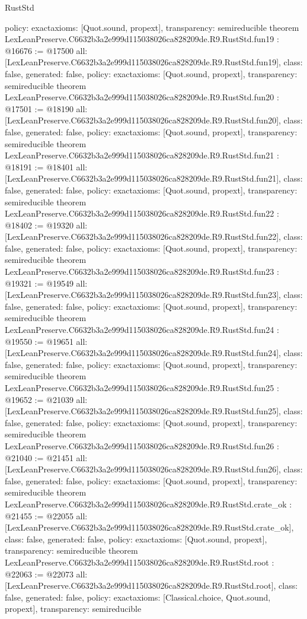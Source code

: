 \begin{lexlean}{RustStd}
\begin{coremodule}
{  policy: exact{axioms: [Quot.sound, propext]},
  transparency: semireducible
}
theorem LexLeanPreserve.C6632b3a2e999d115038026ca828209de.R9.RustStd.fun19 : @16676 := @17500 {
  all: [LexLeanPreserve.C6632b3a2e999d115038026ca828209de.R9.RustStd.fun19],
  class: false,
  generated: false,
  policy: exact{axioms: [Quot.sound, propext]},
  transparency: semireducible
}
theorem LexLeanPreserve.C6632b3a2e999d115038026ca828209de.R9.RustStd.fun20 : @17501 := @18190 {
  all: [LexLeanPreserve.C6632b3a2e999d115038026ca828209de.R9.RustStd.fun20],
  class: false,
  generated: false,
  policy: exact{axioms: [Quot.sound, propext]},
  transparency: semireducible
}
theorem LexLeanPreserve.C6632b3a2e999d115038026ca828209de.R9.RustStd.fun21 : @18191 := @18401 {
  all: [LexLeanPreserve.C6632b3a2e999d115038026ca828209de.R9.RustStd.fun21],
  class: false,
  generated: false,
  policy: exact{axioms: [Quot.sound, propext]},
  transparency: semireducible
}
theorem LexLeanPreserve.C6632b3a2e999d115038026ca828209de.R9.RustStd.fun22 : @18402 := @19320 {
  all: [LexLeanPreserve.C6632b3a2e999d115038026ca828209de.R9.RustStd.fun22],
  class: false,
  generated: false,
  policy: exact{axioms: [Quot.sound, propext]},
  transparency: semireducible
}
theorem LexLeanPreserve.C6632b3a2e999d115038026ca828209de.R9.RustStd.fun23 : @19321 := @19549 {
  all: [LexLeanPreserve.C6632b3a2e999d115038026ca828209de.R9.RustStd.fun23],
  class: false,
  generated: false,
  policy: exact{axioms: [Quot.sound, propext]},
  transparency: semireducible
}
theorem LexLeanPreserve.C6632b3a2e999d115038026ca828209de.R9.RustStd.fun24 : @19550 := @19651 {
  all: [LexLeanPreserve.C6632b3a2e999d115038026ca828209de.R9.RustStd.fun24],
  class: false,
  generated: false,
  policy: exact{axioms: [Quot.sound, propext]},
  transparency: semireducible
}
theorem LexLeanPreserve.C6632b3a2e999d115038026ca828209de.R9.RustStd.fun25 : @19652 := @21039 {
  all: [LexLeanPreserve.C6632b3a2e999d115038026ca828209de.R9.RustStd.fun25],
  class: false,
  generated: false,
  policy: exact{axioms: [Quot.sound, propext]},
  transparency: semireducible
}
theorem LexLeanPreserve.C6632b3a2e999d115038026ca828209de.R9.RustStd.fun26 : @21040 := @21451 {
  all: [LexLeanPreserve.C6632b3a2e999d115038026ca828209de.R9.RustStd.fun26],
  class: false,
  generated: false,
  policy: exact{axioms: [Quot.sound, propext]},
  transparency: semireducible
}
theorem LexLeanPreserve.C6632b3a2e999d115038026ca828209de.R9.RustStd.crate_ok : @21455 := @22055 {
  all: [LexLeanPreserve.C6632b3a2e999d115038026ca828209de.R9.RustStd.crate_ok],
  class: false,
  generated: false,
  policy: exact{axioms: [Quot.sound, propext]},
  transparency: semireducible
}
theorem LexLeanPreserve.C6632b3a2e999d115038026ca828209de.R9.RustStd.root : @22063 := @22073 {
  all: [LexLeanPreserve.C6632b3a2e999d115038026ca828209de.R9.RustStd.root],
  class: false,
  generated: false,
  policy: exact{axioms: [Classical.choice, Quot.sound, propext]},
  transparency: semireducible
}


\end{coremodule}
\end{lexlean}
